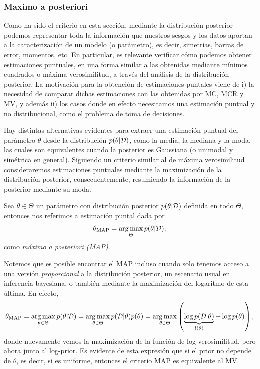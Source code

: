 \subsubsection{Maximo a posteriori}
\label{sub:map}

Como ha sido el criterio en esta sección, mediante la distribución posterior podemos representar toda la información que nuestros sesgos y los datos aportan a la caracterización de un modelo (o parámetro), es decir, simetrías, barras de error, momentos, etc. En particular, es relevante verificar cómo podemos obtener estimaciones puntuales, en una forma similar a las obtenidas mediante mínimos cuadrados o máxima verosimilitud, a través del análisis de la distribución posterior. La motivación para la obtención de estimaciones puntales viene de i) la necesidad de comparar dichas estimaciones con las obtenidas por MC, MCR y MV, y además ii) los casos donde en efecto necesitamos una estimación puntual y no distribucional, como el problema de toma de decisiones.

Hay distintas alternativas evidentes para extraer una estimación puntual del parámetro $\theta$ desde la distribución $p(\theta|{\mathcal D})$, como la media, la mediana y la moda, las cuales son equivalentes cuando la posterior es  Gaussiana (o unimodal y simétrica en general). Siguiendo un criterio similar al de máxima verosimilitud consideraremos estimaciones puntuales mediante la maximización de la distribución posterior, consecuentemente, resumiendo la información de la posterior mediante su moda. 

\begin{definition}
Sea $\theta\in\Theta$ un parámetro con distribución posterior $p(\theta|{\mathcal D})$ definida en todo $\Theta$, entonces nos referimos a estimación puntal dada por
\begin{equation}
	\theta_\text{MAP} = \operatorname*{arg\,max}_{\Theta}p(\theta|{\mathcal D}),
\end{equation}
como \emph{máximo a posteriori (MAP)}.

\end{definition}

Notemos que es posible encontrar el MAP incluso cuando solo tenemos acceso a una versión \emph{proporcional} a la distribución posterior, un escenario usual en inferencia bayesiana, o también mediante la maximización del logaritmo de esta última. En efecto, 
\begin{equation}
	\theta_\text{MAP} = \operatorname*{arg\,max}_{\theta\in\Theta}p(\theta|{\mathcal D}) = \operatorname*{arg\,max}_{\theta\in\Theta}p({\mathcal D}|\theta)p(\theta)= \operatorname*{arg\,max}_{\theta\in\Theta}\left(\underbrace{\log p({\mathcal D}|\theta)}_{l(\theta)} + \log p(\theta)\right),
\end{equation}
donde  nuevamente vemos la maximización de  la función de log-verosimilitud, pero ahora junto al log-prior. Es evidente de esta expresión que si el prior no depende de $\theta$, es decir, si es uniforme, entonces el criterio MAP es equivalente al MV.


